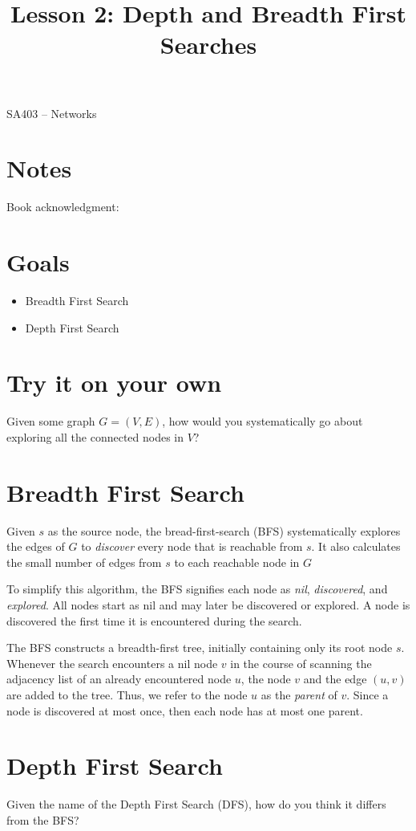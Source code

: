 \documentclass[12pt]{article}
\makeatletter
\theoremstyle{definition}
\newcommand{\graphbox}[5]%
{
\begin{tikzpicture}
     [>=latex,scale=#5]
     
     \draw [->,very thick] (#1, 0) -- (#2, 0) node[right] {$x$};
     \draw [->,very thick] (0, #3) -- (0, #4) node[above] {$y$};
     
     \draw[step=1cm,thick,dotted] (#1,#3) grid (#2,#4);
   \end{tikzpicture}
   }
\renewcommand{\maketitle}{
  \noindent SA403 -- Networks \\

  \begin{center}\Large{\textbf{\@title}}\end{center}
}
\makeatother
\begin{document}

\title{Lesson 2: Depth and Breadth First Searches}


\maketitle


\section*{Notes}

Book acknowledgment:
\section*{Goals}
\begin{itemize}
\item Breadth First Search
\item Depth First Search
\end{itemize}

\section{Try it on your own}


Given some graph $G = (V,E)$, how would you systematically go about exploring all the connected nodes in $V$?


\section{Breadth First Search}

Given $s$ as the source node, the bread-first-search (BFS) systematically explores the edges of $G$ to \emph{discover} every node that is reachable from $s$. It also calculates the small number of edges from $s$ to each reachable node in $G$

To simplify this algorithm, the BFS signifies each node as \emph{nil}, \emph{discovered}, and \emph{explored}. All nodes start as nil and may later be discovered or explored. A node is discovered the first time it is encountered during the search.

The BFS constructs a breadth-first tree, initially containing only its root node $s$. Whenever the search encounters a nil node $v$ in the course of scanning the adjacency list of an already encountered node $u$, the node $v$ and the edge $(u,v)$ are added to the tree. Thus, we refer to the node $u$ as the \emph{parent} of $v$. Since a node is discovered at most once, then each node has at most one parent. 

\section{Depth First Search}

Given the name of the Depth First Search (DFS), how do you think it differs from the BFS?
\end{document}
